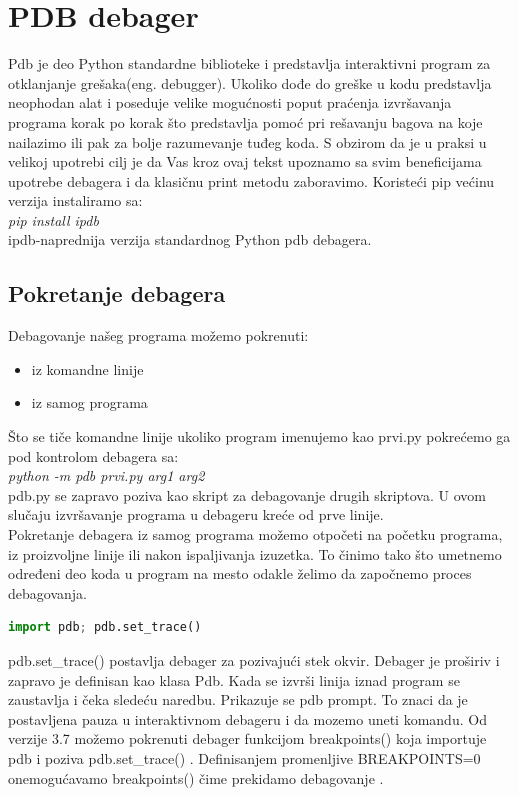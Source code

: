 \documentclass[a4paper]{article}
\begin{document}
\section{PDB debager}
Pdb je deo Python standardne biblioteke i predstavlja interaktivni program za otklanjanje grešaka(eng. debugger)\cite{pdbDocPyt}. Ukoliko dođe do greške u kodu predstavlja neophodan alat i poseduje velike mogućnosti poput praćenja izvršavanja programa korak po korak što predstavlja pomoć pri rešavanju bagova na koje nailazimo ili pak za bolje razumevanje tuđeg koda. S obzirom da je u praksi u velikoj upotrebi cilj je da Vas kroz ovaj tekst upoznamo sa svim beneficijama upotrebe debagera i da klasičnu print metodu zaboravimo. Koristeći pip većinu verzija instaliramo sa:
\\ \emph{pip install ipdb}
\\ipdb-naprednija verzija standardnog Python pdb debagera.
\subsection{Pokretanje debagera}
Debagovanje našeg programa možemo pokrenuti:
\begin{itemize}
\item iz komandne linije
\item iz samog programa
\end{itemize}
Što se tiče komandne linije ukoliko program imenujemo kao prvi.py pokrećemo ga pod kontrolom debagera sa:
\\\emph{python -m pdb prvi.py arg1 arg2}
\\pdb.py se zapravo poziva kao skript za debagovanje drugih skriptova. U ovom slučaju izvršavanje programa u debageru kreće od prve linije.
\\Pokretanje debagera iz samog programa možemo otpočeti na početku programa, iz proizvoljne linije ili nakon ispaljivanja izuzetka. To činimo tako što umetnemo određeni deo koda u program na mesto odakle želimo da započnemo proces debagovanja.
\begin{lstlisting}[language = python, caption = {Započinjemo debagovanje}]
import pdb; pdb.set_trace()
\end{lstlisting}
pdb.set\_trace() postavlja debager za pozivajući stek okvir. Debager je proširiv i zapravo je definisan kao klasa Pdb. Kada se izvrši linija iznad program se zaustavlja i čeka sledeću naredbu. Prikazuje se pdb prompt. To znaci da je postavljena pauza u interaktivnom debageru i da mozemo uneti komandu.
Od verzije 3.7 možemo pokrenuti debager funkcijom breakpoints() koja importuje pdb i poziva pdb.set\_trace() \cite{pdbExamples}. Definisanjem promenljive BREAKPOINTS=0 onemogućavamo breakpoints() čime prekidamo debagovanje \cite{pdbExamples}.
\end{document}
